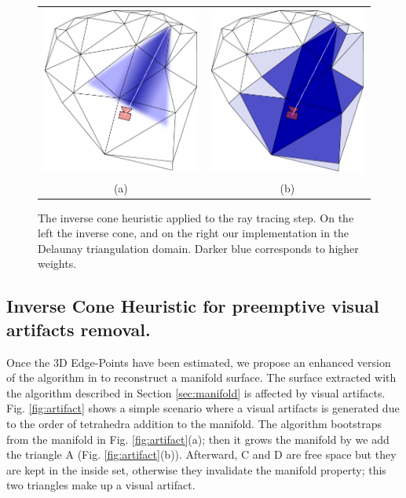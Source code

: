\begin{figure}
\centering
\begin{tabular}{cc}
\includegraphics[width=0.45\columnwidth]{./img/conicCarvingContinue}&
\includegraphics[width=0.45\columnwidth]{./img/conicCarvingImplemented}\\
(a) & (b)
\end{tabular}
\caption{The inverse cone heuristic applied to the ray tracing step. On the left the inverse cone, and on the right our implementation in the Delaunay triangulation domain. Darker blue corresponds to higher weights.}
\label{fig:ConicCarving}
\end{figure}

\subsection{Inverse Cone Heuristic for preemptive visual artifacts removal.}
\label{sec:visualartifacts}
Once the 3D Edge-Points have been estimated, we propose an enhanced version of the algorithm in \cite{litvinov_lhuillier_13} to reconstruct a manifold surface.
The surface extracted with the algorithm described in Section \ref{sec:manifold} is affected by visual artifacts.
Fig. \ref{fig:artifact} shows a simple scenario where a visual artifacts is generated due to the order of tetrahedra addition to the manifold.
The algorithm bootstraps from the manifold in Fig. \ref{fig:artifact}(a); then it grows the manifold by we add the triangle A (Fig. \ref{fig:artifact}(b)). Afterward, C and D are free space but they are kept in the inside set, otherwise they invalidate the manifold property; this two triangles make up a visual artifact.

